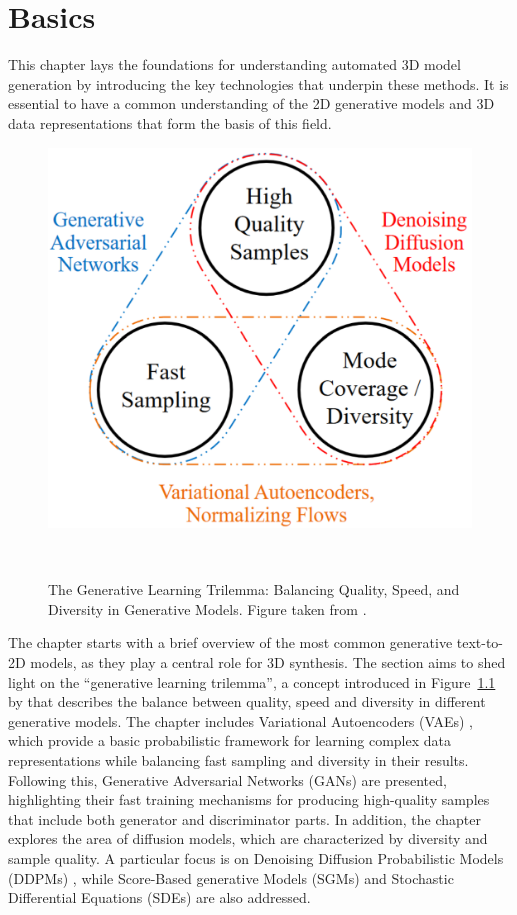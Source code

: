 \chapter{Basics}\label{ch:basics}

This chapter lays the foundations for understanding automated 3D model generation by introducing the key technologies that underpin these methods. It is essential to have a common understanding of the 2D generative models and 3D data representations that form the basis of this field.

\begin{figure}[ht]
  \centering
  \includegraphics[width=.4\columnwidth]{figures/basics/BasicTrilemma.png}
  \caption{The Generative Learning Trilemma: Balancing Quality, Speed, and Diversity in Generative Models. Figure taken from \citep{xiao2022tackling}.}~\label{fig:generativeTrilemma}
\end{figure}

The chapter starts with a brief overview of the most common generative text-to-2D models, as they play a central role for 3D synthesis. The section aims to shed light on the ``generative learning trilemma'', a concept introduced in Figure~\ref{fig:generativeTrilemma} by \citeauthor{xiao2022tackling} that describes the balance between quality, speed and diversity in different generative models. The chapter includes Variational Autoencoders (VAEs) \citep{kingmaVAE,rezendeVAE}, which provide a basic probabilistic framework for learning complex data representations while balancing fast sampling and diversity in their results. Following this, Generative Adversarial Networks (GANs) \citep{goodfellowGAN} are presented, highlighting their fast training mechanisms for producing high-quality samples that include both generator and discriminator parts. In addition, the chapter explores the area of diffusion models, which are characterized by diversity and sample quality. A particular focus is on Denoising Diffusion Probabilistic Models (DDPMs) \citep{hoDDPMs,sohlDDPM}, while Score-Based generative Models (SGMs) \citep{song2019SGM} and Stochastic Differential Equations (SDEs) \citep{song2020score,song2021maximum} are also addressed. 

